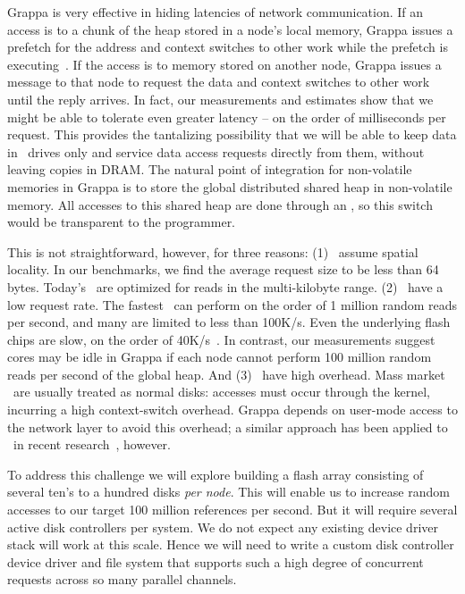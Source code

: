 Grappa is very effective in hiding latencies of network communication.  If an access is to a chunk of the heap stored in a node's local memory, Grappa issues a prefetch for the address and context switches to other work while the prefetch is executing~\cite{Nelson:hotpar2011}. If the access is to memory stored on another node, Grappa issues a message to that node to request the data and context switches to other work until the reply arrives.  In fact, our measurements and estimates show that we might be able to tolerate even greater latency -- on the order of milliseconds per request.  This provides the tantalizing possibility that we will be able to keep data in \ssd\ drives only and service data access requests directly from them, without leaving copies in DRAM.  The natural point of integration for non-volatile memories in Grappa is to store the global distributed shared heap in non-volatile memory. All accesses to this shared heap are done through an \api, so this switch would be transparent to the programmer.

This is not straightforward, however, for three reasons: (1) \ssds\ assume spatial locality. In our benchmarks, we find the average request size to be less than 64 bytes. Today's \ssds\ are optimized for reads in the multi-kilobyte range. (2) \ssds\ have a low request rate. The fastest~\cite{fusionio} can perform on the order of 1 million random reads per second, and many are limited to less than 100K/s. Even the underlying flash chips are slow, on the order of 40K/s~\cite{micronFlash}. In contrast, our measurements suggest cores may be idle in Grappa if each node cannot perform 100 million random reads per second of the global heap. And (3) \ssds\ have high overhead. Mass market \ssds\ are usually treated as normal disks: accesses must occur through the kernel, incurring a high context-switch overhead. Grappa depends on user-mode access to the network layer to avoid this overhead; a similar approach has been applied to \ssds\ in recent research~\cite{caulfield:2012}, however.

To address this challenge we will explore building a flash array consisting of several ten's to a hundred disks \emph{per node}.  This will enable us to increase random accesses to our target 100 million references per second. But it will require several active disk controllers per system.  We do not expect any existing device driver stack will work at this scale.  Hence we will need to write a custom disk controller device driver and file system that supports such a high degree of concurrent requests across so many parallel channels.

